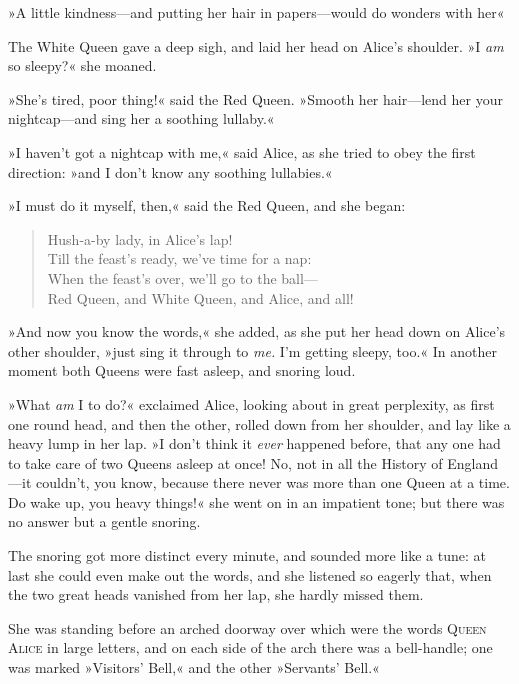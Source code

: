 »A little kindness—and putting her hair in papers—would do wonders with her\longdash«

The White Queen gave a deep sigh, and laid her head on Alice's shoulder. »I \textit{am} so sleepy?« she moaned.

»She's tired, poor thing!« said the Red Queen. »Smooth her hair—lend her your nightcap—and sing her a soothing lullaby.«

»I haven't got a nightcap with me,« said Alice, as she tried to obey the first direction: »and I don't know any soothing lullabies.«

»I must do it myself, then,« said the Red Queen, and she began:

\begin{verse}
	\begin{altverse}
Hush-a-by lady, in Alice's lap!\\
Till the feast's ready, we've time for a nap:\\
When the feast's over, we'll go to the ball—\\
Red Queen, and White Queen, and Alice, and all!
\end{altverse}
\end{verse}

»And now you know the words,« she added, as she put her head down on Alice's other shoulder, »just sing it through to \textit{me.} I'm getting sleepy, too.« In another moment both Queens were fast asleep, and snoring loud.

»What \textit{am} I to do?« exclaimed Alice, looking about in great perplexity, as first one round head, and then the other, rolled down from her shoulder, and lay like a heavy lump in her lap. »I don't think it \textit{ever} happened before, that any one had to take care of two Queens asleep at once! No, not in all the History of England—it couldn't, you know, because there never was more than one Queen at a time. Do wake up, you heavy things!« she went on in an impatient tone; but there was no answer but a gentle snoring.

The snoring got more distinct every minute, and sounded more like a tune: at last she could even make out the words, and she listened so eagerly that, when the two great heads vanished from her lap, she hardly missed them.

She was standing before an arched doorway over which were the words \textsc{Queen Alice} in large letters, and on each side of the arch there was a bell-handle; one was marked »Visitors' Bell,« and the other »Servants' Bell.«

